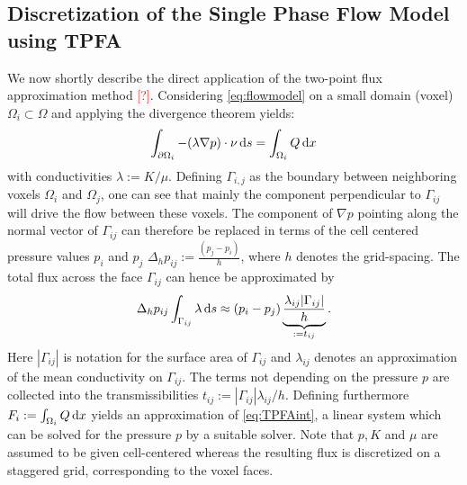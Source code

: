 \documentclass[paper=a4, fontsize=11pt,parskip=half,headings=small]{scrartcl}
\newcommand{\missingsource}{\textcolor{red}{[?]}}
\begin{document}
	\subsection{Discretization of the Single Phase Flow Model using TPFA} \label{sec:numflow}

	We now shortly describe the direct application of the two-point flux approximation method \missingsource.
	Considering \eqref{eq:flowmodel} on a small domain (voxel) $\Omega_i \subset \Omega$ and applying the divergence theorem yields:
	\begin{equation}
		\int_{\partial \Omega_i}   -(\lambda \nabla p) \cdot \nu \,\mathrm{d} s = \int_{\Omega_i}Q \,\mathrm{d} x
	\label{eq:TPFAint}
	\end{equation}
	with conductivities $\lambda := K/\mu$.
	Defining $\Gamma_{i,j}$ as the boundary between neighboring voxels $\Omega_i$ and $\Omega_j$, one can see that mainly the component perpendicular to $\Gamma_{ij}$ will drive the flow between these voxels.
	The component of $\nabla p$ pointing along the normal vector of $\Gamma_{ij}$ can therefore be replaced in terms of the cell centered pressure values $p_i$ and $p_j$
 	$\Delta_h p_{ij} := \frac{(p_j - p_i)}{h}$, where $h$ denotes the grid-spacing.
	The total flux across the face $\Gamma_{ij}$ can hence be approximated by
	\[
		\Delta_h p_{ij} \int_{\Gamma_{ij}}\lambda \,\mathrm{d} s \approx (p_i - p_j) \underbrace{\frac{\lambda_{ij} \vert \Gamma_{ij} \vert}{h}}_{:=t_{ij}}.
	\]
	Here $|\Gamma_{ij}|$ is notation for the surface area of $\Gamma_{ij}$ and $\lambda_{ij}$ denotes an approximation of the mean conductivity on $\Gamma_{ij}$.
	The terms not depending on the pressure $p$ are collected into the transmissibilities $t_{ij}:=|\Gamma_{ij}|\lambda_{ij}/h$.
	Defining furthermore $F_i:=\int_{\Omega_i}Q\,\mathrm{d} x$ yields an approximation of \eqref{eq:TPFAint}, a linear system which can be solved for the pressure $p$ by a suitable solver.
	Note that $p,K$ and $\mu$ are assumed to be given cell-centered whereas the resulting flux is discretized on a staggered grid, corresponding to the voxel faces.


\end{document}
